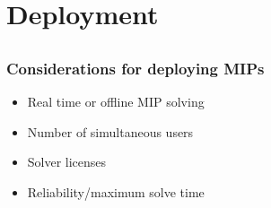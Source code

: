 \documentclass{beamer}
\begin{document}
\section{Deployment}
\subsection{}

\begin{frame}
  \frametitle{Considerations for deploying MIPs}
  \begin{itemize}
  \item Real time or offline MIP solving
  \item Number of simultaneous users
  \item Solver licenses
  \item Reliability/maximum solve time
  \end{itemize}
\end{frame}
\end{document}
